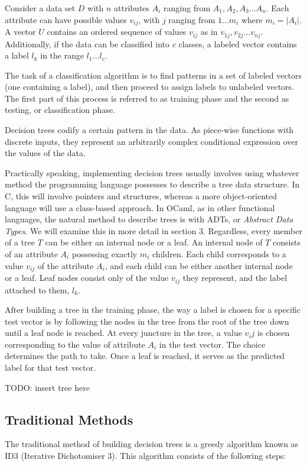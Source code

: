\documentclass[12pt, letterpaper]{article}
\begin{document}
Consider a data set $D$ with $n$ attributes $A_i$ ranging from $A_1, A_2, A_3 \dots A_n$. Each attribute can have possible values $v_{ij}$, with $j$ ranging from $1\dots m_i$ where $m_i = |A_i|$. A vector $U$ contains an ordered sequence of values $v_{ij}$ as in $v_{1j}, v_{2j}\dots v_{nj}$. Additionally, if the data can be classified into $c$ classes, a labeled vector contains a label $l_k$ in the range $l_1\dots l_c$. 

The task of a classification algorithm is to find patterns in a set of labeled vectors (one containing a label), and then proceed to assign labels to unlabeled vectors. The first part of this process is referred to as training phase and the second as testing, or classification phase.

Decision trees codify a certain pattern in the data. As piece-wise functions with discrete inputs, they represent an arbitrarily complex conditional expression over the values of the data. 

Practically speaking, implementing decision trees usually involves using whatever method the programming language possesses to describe a tree data structure. In C, this will involve pointers and structures, whereas a more object-oriented language will use a class-based approach. In OCaml, as in other functional languages, the natural method to describe trees is with ADTs, or \emph{Abstract Data Types}. We will examine this in more detail in section 3. Regardless, every member of a tree $T$ can be either an internal node or a leaf. An internal node of $T$ consists of an attribute $A_i$ possessing exactly $m_i$ children. Each child corresponds to a value $v_{ij}$ of the attribute $A_i$, and each child can be either another internal node or a leaf. Leaf nodes consist only of the value $v_{ij}$ they represent, and the label attached to them, $l_k$.

After building a tree in the training phase, the way a label is chosen for a specific test vector is by following the nodes in the tree from the root of the tree down until a leaf node is reached. At every juncture in the tree, a value $v_ij$ is chosen corresponding to the value of attribute $A_i$ in the test vector. The choice determines the path to take. Once a leaf is reached, it serves as the predicted label for that test vector.

TODO: insert tree here

\subsection{Traditional Methods}
The traditional method of building decision trees is a greedy algorithm known as ID3 (Iterative Dichotomiser 3)\cite{quinlan1986induction}. This algorithm consists of the following steps:
\end{document}
